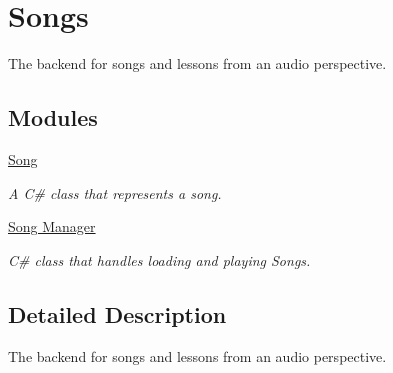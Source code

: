 \hypertarget{group___song_group}{}\section{Songs}
\label{group___song_group}


The backend for songs and lessons from an audio perspective.  


\subsection*{Modules}
\begin{DoxyCompactItemize}
\item 
\hyperlink{group___doc_song}{Song}
\begin{DoxyCompactList}\small\item\em A C\# class that represents a song. \end{DoxyCompactList}\item 
\hyperlink{group___doc_s_m}{Song Manager}
\begin{DoxyCompactList}\small\item\em C\# class that handles loading and playing Songs. \end{DoxyCompactList}\end{DoxyCompactItemize}


\subsection{Detailed Description}
The backend for songs and lessons from an audio perspective. 

